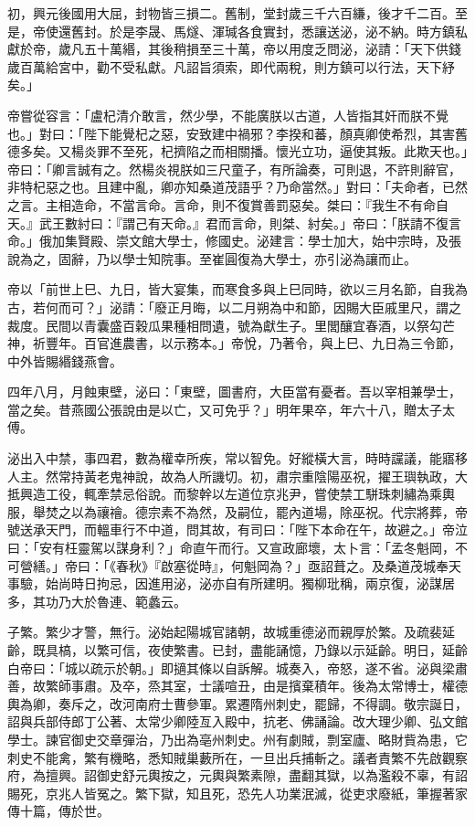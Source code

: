 \begin{pinyinscope}
 初，興元後國用大屈，封物皆三損二。舊制，堂封歲三千六百縑，後才千二百。至是，帝使還舊封。於是李晟、馬燧、渾瑊各食實封，悉讓送泌，泌不納。時方鎮私獻於帝，歲凡五十萬緡，其後稍損至三十萬，帝以用度乏問泌，泌請：「天下供錢歲百萬給宮中，勸不受私獻。凡詔旨須索，即代兩稅，則方鎮可以行法，天下紓矣。」



 帝嘗從容言：「盧杞清介敢言，然少學，不能廣朕以古道，人皆指其奸而朕不覺也。」對曰：「陛下能覺杞之惡，安致建中禍邪？李揆和蕃，顏真卿使希烈，其害舊德多矣。又楊炎罪不至死，杞擠陷之而相關播。懷光立功，逼使其叛。此欺天也。」帝曰：「卿言誠有之。然楊炎視朕如三尺童子，有所論奏，可則退，不許則辭官，非特杞惡之也。且建中亂，卿亦知桑道茂語乎？乃命當然。」對曰：「夫命者，已然之言。主相造命，不當言命。言命，則不復賞善罰惡矣。桀曰：『我生不有命自天。』武王數紂曰：『謂己有天命。』君而言命，則桀、紂矣。」帝曰：「朕請不復言命。」俄加集賢殿、崇文館大學士，修國史。泌建言：學士加大，始中宗時，及張說為之，固辭，乃以學士知院事。至崔圓復為大學士，亦引泌為讓而止。



 帝以「前世上巳、九日，皆大宴集，而寒食多與上巳同時，欲以三月名節，自我為古，若何而可？」泌請：「廢正月晦，以二月朔為中和節，因賜大臣戚里尺，謂之裁度。民間以青囊盛百穀瓜果種相問遺，號為獻生子。里閭釀宜春酒，以祭勾芒神，祈豐年。百官進農書，以示務本。」帝悅，乃著令，與上巳、九日為三令節，中外皆賜緡錢燕會。



 四年八月，月蝕東壁，泌曰：「東壁，圖書府，大臣當有憂者。吾以宰相兼學士，當之矣。昔燕國公張說由是以亡，又可免乎？」明年果卒，年六十八，贈太子太傅。



 泌出入中禁，事四君，數為權幸所疾，常以智免。好縱橫大言，時時讜議，能寤移人主。然常持黃老鬼神說，故為人所譏切。初，肅宗重陰陽巫祝，擢王璵執政，大抵興造工役，輒牽禁忌俗說。而黎幹以左道位京兆尹，嘗使禁工駢珠刺繡為乘輿服，舉焚之以為禳禬。德宗素不為然，及嗣位，罷內道場，除巫祝。代宗將葬，帝號送承天門，而轀車行不中道，問其故，有司曰：「陛下本命在午，故避之。」帝泣曰：「安有枉靈駕以謀身利？」命直午而行。又宣政廊壞，太卜言：「孟冬魁岡，不可營繕。」帝曰：「《春秋》『啟塞從時』，何魁岡為？」亟詔葺之。及桑道茂城奉天事驗，始尚時日拘忌，因進用泌，泌亦自有所建明。獨柳玭稱，兩京復，泌謀居多，其功乃大於魯連、範蠡云。



 子繁。繁少才警，無行。泌始起陽城官諸朝，故城重德泌而親厚於繁。及疏裴延齡，既具槁，以繁可信，夜使繁書。已封，盡能誦憶，乃錄以示延齡。明日，延齡白帝曰：「城以疏示於朝。」即擿其條以自訴解。城奏入，帝怒，遂不省。泌與梁肅善，故繁師事肅。及卒，烝其室，士議喧丑，由是擯棄積年。後為太常博士，權德輿為卿，奏斥之，改河南府士曹參軍。累遷隋州刺史，罷歸，不得調。敬宗誕日，詔與兵部侍郎丁公著、太常少卿陸亙入殿中，抗老、佛誦論。改大理少卿、弘文館學士。諫官御史交章彈治，乃出為亳州刺史。州有劇賊，剽室廬、略財貲為患，它刺史不能禽，繁有機略，悉知賊巢藪所在，一旦出兵捕斬之。議者責繁不先啟觀察府，為擅興。詔御史舒元輿按之，元輿與繁素隙，盡翻其獄，以為濫殺不辜，有詔賜死，京兆人皆冤之。繁下獄，知且死，恐先人功業泯滅，從吏求廢紙，筆握著家傳十篇，傳於世。




\end{pinyinscope}
